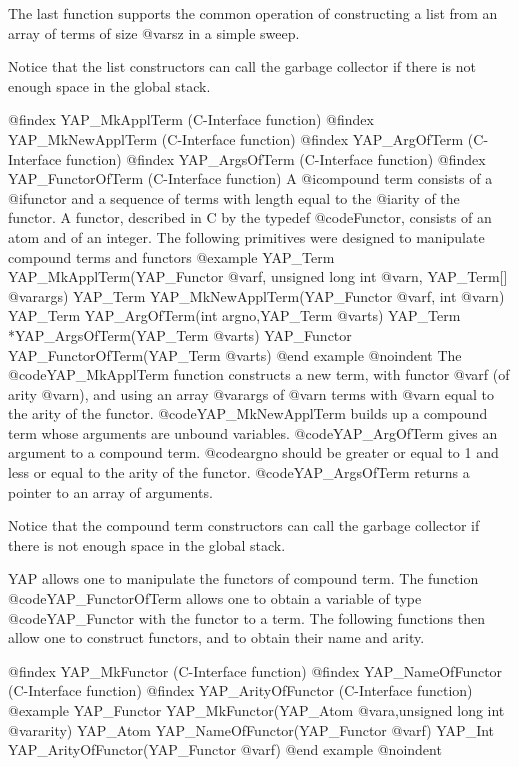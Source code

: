 {{{{{{{{The last function supports the common operation of constructing a list from an
array of terms of size @var{sz} in a simple sweep.

Notice that the list constructors can call the garbage collector if
there is not enough space in the global stack. 

@findex YAP_MkApplTerm (C-Interface function)
@findex YAP_MkNewApplTerm (C-Interface function)
@findex YAP_ArgOfTerm (C-Interface function)
@findex YAP_ArgsOfTerm (C-Interface function)
@findex YAP_FunctorOfTerm (C-Interface function)
A @i{compound} term consists of a @i{functor} and a sequence of terms with
length equal to the @i{arity} of the functor. A functor, described in C by
the typedef @code{Functor}, consists of an atom and of an integer.
The following primitives were designed to manipulate compound terms and 
functors
@example
      YAP_Term     YAP_MkApplTerm(YAP_Functor @var{f}, unsigned long int @var{n}, YAP_Term[] @var{args})
      YAP_Term     YAP_MkNewApplTerm(YAP_Functor @var{f}, int @var{n})
      YAP_Term     YAP_ArgOfTerm(int argno,YAP_Term @var{ts})
      YAP_Term    *YAP_ArgsOfTerm(YAP_Term @var{ts})
      YAP_Functor  YAP_FunctorOfTerm(YAP_Term @var{ts})
@end example
@noindent
The @code{YAP_MkApplTerm} function constructs a new term, with functor
@var{f} (of arity @var{n}), and using an array @var{args} of @var{n}
terms with @var{n} equal to the arity of the
functor. @code{YAP_MkNewApplTerm} builds up a compound term whose
arguments are unbound variables. @code{YAP_ArgOfTerm} gives an argument
to a compound term. @code{argno} should be greater or equal to 1 and
less or equal to the arity of the functor.  @code{YAP_ArgsOfTerm}
returns a pointer to an array of arguments.

Notice that the compound term constructors can call the garbage
collector if there is not enough space in the global stack.

YAP allows one to manipulate the functors of compound term. The function
@code{YAP_FunctorOfTerm} allows one to obtain a variable of type
@code{YAP_Functor} with the functor to a term. The following functions
then allow one to construct functors, and to obtain their name and arity. 

@findex YAP_MkFunctor (C-Interface function)
@findex YAP_NameOfFunctor (C-Interface function)
@findex YAP_ArityOfFunctor (C-Interface function)
@example
      YAP_Functor  YAP_MkFunctor(YAP_Atom @var{a},unsigned long int @var{arity})
      YAP_Atom     YAP_NameOfFunctor(YAP_Functor @var{f})
      YAP_Int      YAP_ArityOfFunctor(YAP_Functor @var{f})
@end example
@noindent

}}}}}}}}

